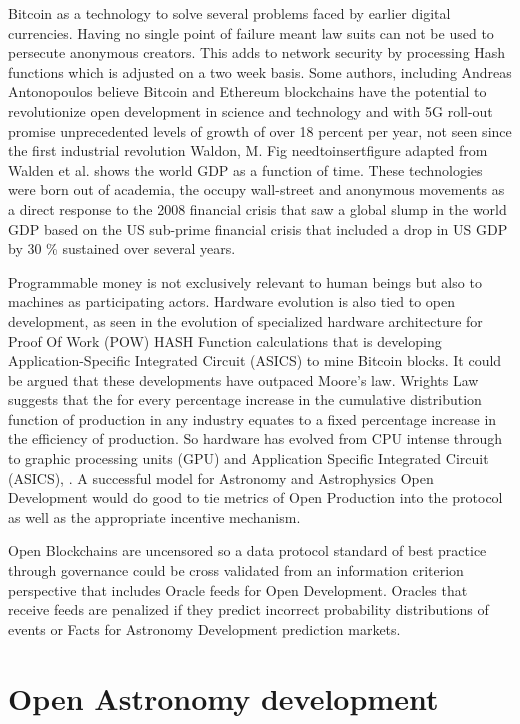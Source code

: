 \documentclass[final,5p,times,twocolumn,authoryear]{elsarticle}
\begin{document}
Bitcoin as a technology to solve several problems faced by earlier digital currencies. Having no single point of failure meant law suits can not be used to persecute anonymous creators. This adds to network security by processing Hash functions which is adjusted on a two week basis. Some authors, including Andreas Antonopoulos believe Bitcoin and Ethereum blockchains have the potential to revolutionize open development in science and technology and with 5G roll-out promise unprecedented levels of growth of over 18 percent per year, not seen since the first industrial revolution Waldon, M.  Fig needtoinsertfigure adapted from Walden et al. shows the world GDP as a function of time. These technologies were born out of academia, the occupy wall-street and anonymous movements as a direct response to the 2008 financial crisis that saw a global slump in the world GDP based on the US sub-prime financial crisis  that included a drop in US GDP by 30 \% sustained over several years.
 
Programmable money is not exclusively relevant to human beings but also to machines as participating actors. Hardware evolution is also tied to open development, as seen in the evolution of specialized hardware architecture for Proof Of Work (POW) HASH Function calculations that is developing Application-Specific Integrated Circuit (ASICS) to mine Bitcoin blocks. It could be argued that these developments have outpaced Moore's law.  Wrights Law suggests that the for every percentage increase in the cumulative distribution function of production in any industry equates to a fixed percentage increase in the efficiency of production. So hardware has evolved from CPU intense through to graphic processing units (GPU) and  Application Specific Integrated Circuit  (ASICS), \cite{10.1371/journal.pone.0052669}. A successful model for Astronomy and Astrophysics Open Development would do good to tie metrics of Open Production into the protocol as well as the appropriate incentive mechanism.       

Open Blockchains are uncensored so a data protocol standard of best practice through governance could be cross validated from an information criterion perspective that includes Oracle feeds for Open Development.  Oracles that receive feeds are penalized if they predict incorrect probability distributions of events or Facts for Astronomy Development prediction markets. 

\section{Open Astronomy development}
\label{sec:usecase}
\end{document}
